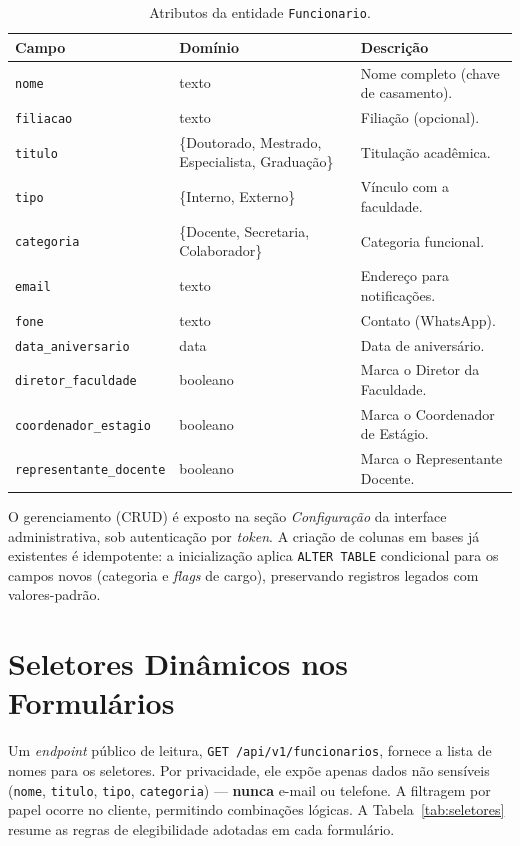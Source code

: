 \documentclass[12pt,a4paper]{report}
\begin{document}
\begin{table}[H]
\centering
\small
\begin{tabularx}{\textwidth}{l l X}
\toprule
\textbf{Campo} & \textbf{Domínio} & \textbf{Descrição} \\
\midrule
\texttt{nome}             & texto                & Nome completo (chave de casamento). \\
\texttt{filiacao}         & texto                & Filiação (opcional). \\
\texttt{titulo}           & \{Doutorado, Mestrado, Especialista, Graduação\} & Titulação acadêmica. \\
\texttt{tipo}             & \{Interno, Externo\} & Vínculo com a faculdade. \\
\texttt{categoria}        & \{Docente, Secretaria, Colaborador\} & Categoria funcional. \\
\texttt{email}            & texto                & Endereço para notificações. \\
\texttt{fone}             & texto                & Contato (WhatsApp). \\
\texttt{data\_aniversario}& data                 & Data de aniversário. \\
\texttt{diretor\_faculdade}     & booleano       & Marca o Diretor da Faculdade. \\
\texttt{coordenador\_estagio}   & booleano       & Marca o Coordenador de Estágio. \\
\texttt{representante\_docente} & booleano       & Marca o Representante Docente. \\
\bottomrule
\end{tabularx}
\caption{Atributos da entidade \texttt{Funcionario}.}
\label{tab:funcionario}
\end{table}

O gerenciamento (CRUD) é exposto na seção \emph{Configuração} da interface
administrativa, sob autenticação por \textit{token}. A criação de colunas em
bases já existentes é idempotente: a inicialização aplica \texttt{ALTER TABLE}
condicional para os campos novos (categoria e \textit{flags} de cargo),
preservando registros legados com valores-padrão.

\section{Seletores Dinâmicos nos Formulários}

Um \textit{endpoint} público de leitura, \texttt{GET /api/v1/funcionarios},
fornece a lista de nomes para os seletores. Por privacidade, ele expõe apenas
dados não sensíveis (\texttt{nome}, \texttt{titulo}, \texttt{tipo},
\texttt{categoria}) --- \textbf{nunca} e-mail ou telefone. A filtragem por papel
ocorre no cliente, permitindo combinações lógicas. A
Tabela~\ref{tab:seletores} resume as regras de elegibilidade adotadas em cada
formulário.
\end{document}
